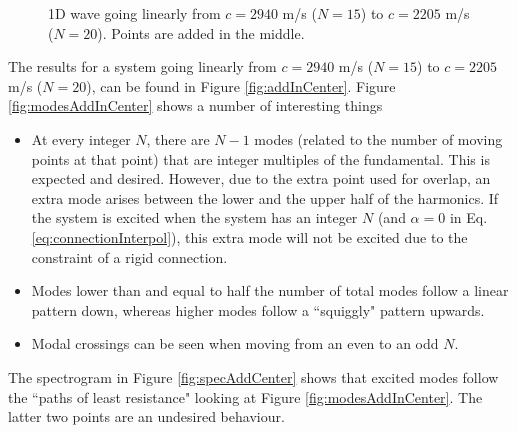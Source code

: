 \documentclass[dvipsnames]{article}
\begin{document}
\begin{figure}[h]
    \centering
    \hspace{0.05\textwidth}
    \caption{1D wave going linearly from $c = 2940$ m/s ($N=15$) to $c =2205$ m/s ($N=20$). Points are added in the middle.}\label{fig:altCubAddInCenter}
\end{figure}

The results for a system going linearly from $c=2940$ m/s ($N=15$) to $c = 2205$ m/s ($N=20$), can be found in Figure \ref{fig:addInCenter}. Figure \ref{fig:modesAddInCenter} shows a number of interesting things 
\begin{itemize}
    \item At every integer $N$, there are $N-1$ modes (related to the number of moving points at that point) that are integer multiples of the fundamental. This is expected and desired. However, due to the extra point used for overlap, an extra mode arises between the lower and the upper half of the harmonics. If the system is excited when the system has an integer $N$ (and $\alpha = 0$ in Eq. \eqref{eq:connectionInterpol}), this extra mode will not be excited due to the constraint of a rigid connection. 
    \item Modes lower than and equal to half the number of total modes follow a linear pattern down, whereas higher modes follow a ``squiggly" pattern upwards.
    \item Modal crossings can be seen when moving from an even to an odd $N$.
\end{itemize}
The spectrogram in Figure \ref{fig:specAddCenter} shows that excited modes follow the ``paths of least resistance" looking at Figure \ref{fig:modesAddInCenter}. The latter two points are an undesired behaviour. 
\end{document}
